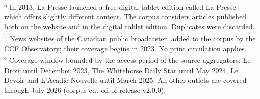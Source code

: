 \documentclass[12pt]{article}
\renewcommand\_{\texttt{\detokenize{_}\allowbreak}}
\begin{document}
\vspace{0.5em}
\noindent\footnotesize\textsuperscript{a} In 2013, La Presse launched a free digital tablet edition called La Presse+ which offers slightly different content. The corpus considers articles published both on the website and in the digital tablet edition. Duplicates were discarded.\\
\textsuperscript{b} News websites of the Canadian public broadcaster, added to the corpus by the CCF Observatory; their coverage begins in 2023. No print circulation applies.\\
\textsuperscript{c} Coverage window bounded by the access period of the source aggregators: Le Droit until December 2023, The Whitehorse Daily Star until May 2024, Le Devoir and L'Acadie Nouvelle until March 2025. All other outlets are covered through July 2026 (corpus cut-off of release v2.0.0).
\endlandscape
\end{document}
